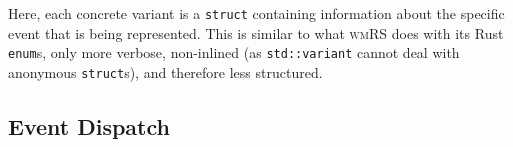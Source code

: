Here,  each  concrete  variant  is a  \cpp  \texttt{struct}  containing
information  about  the  specific  event  that is  being  represented.  This  is
similar to what \textsc{wmRS} does  with its Rust \texttt{enum}s, only
more verbose,  non-inlined (as  \texttt{std::variant} cannot  deal with
anonymous \texttt{struct}s), and therefore less structured.

\subsection{Event Dispatch}
{ \textcolor{gray}\blindtext }
